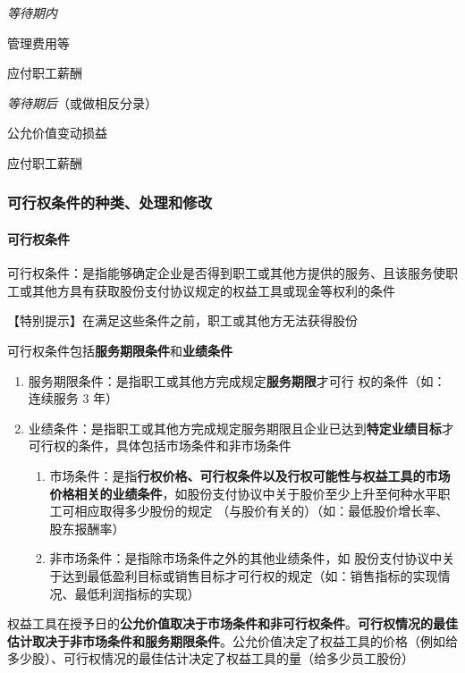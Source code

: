 \documentclass[UTF8,12pt]{ctexart}
\newenvironment{Dr}{%
	\begin{list}{}%
		{
			\setlength{\leftmargin}{2em}
			\setlength{\labelwidth}{2em}
			\setlength{\labelsep}{0pt}
			\setlength{\itemindent}{0pt}
			\setlength{\listparindent}{0pt}
			\setlength{\parsep}{0pt}
			\setlength{\topsep}{0pt}
		}
		\item[\textbf{借：}]
	}{%
	\end{list}
}
\newenvironment{Cr}{%
	\begin{list}{}%
		{
			\setlength{\leftmargin}{3em}
			\setlength{\labelwidth}{2em}
			\setlength{\labelsep}{0pt}
			\setlength{\itemindent}{0pt}
			\setlength{\listparindent}{0pt}
			\setlength{\parsep}{0pt}
			\setlength{\topsep}{0pt}
		}
		\item[\textbf{贷：}]
	}{%
	\end{list}
}
\numberwithin{equation}{section} %
\numberwithin{figure}{section}
\numberwithin{table}{section}
\begin{document}
	\textit{等待期内}
	
	\begin{Dr}
		管理费用等
	\end{Dr}
	\begin{Cr}
		应付职工薪酬
	\end{Cr}
	
	\textit{等待期后}（或做相反分录）
	
	\begin{Dr}
		公允价值变动损益
	\end{Dr}
	\begin{Cr}
		应付职工薪酬
	\end{Cr}
	
	
	\subsubsection{可行权条件的种类、处理和修改}
	\paragraph{可行权条件}可行权条件：是指能够确定企业是否得到职工或其他方提供的服务、且该服务使职工或其他方具有获取股份支付协议规定的权益工具或现金等权利的条件
	
	【特别提示】在满足这些条件之前，职工或其他方无法获得股份
	
	可行权条件包括\textbf{服务期限条件}和\textbf{业绩条件}
	\begin{enumerate}
		\item 服务期限条件：是指职工或其他方完成规定\textbf{服务期限}才可行 权的条件（如：连续服务 3 年）
		
		\item 业绩条件：是指职工或其他方完成规定服务期限且企业已达到\textbf{特定业绩目标}才可行权的条件，具体包括市场条件和非市场条件
		\begin{enumerate}
			\item 市场条件：是指\textbf{行权价格、可行权条件以及行权可能性与权益工具的市场价格相关的业绩条件}，如股份支付协议中关于股价至少上升至何种水平职工可相应取得多少股份的规定
			（与股价有关的）（如：最低股价增长率、股东报酬率）
			
			\item 非市场条件：是指除市场条件之外的其他业绩条件，如 股份支付协议中关于达到最低盈利目标或销售目标才可行权的规定（如：销售指标的实现情况、最低利润指标的实现）
		\end{enumerate}
	\end{enumerate}
	
	权益工具在授予日的\textbf{公允价值取决于市场条件和非可行权条件}。\textbf{可行权情况的最佳估计取决于非市场条件和服务期限条件}。公允价值决定了权益工具的价格（例如给多少股）、可行权情况的最佳估计决定了权益工具的量（给多少员工股份）
	
\end{document}
